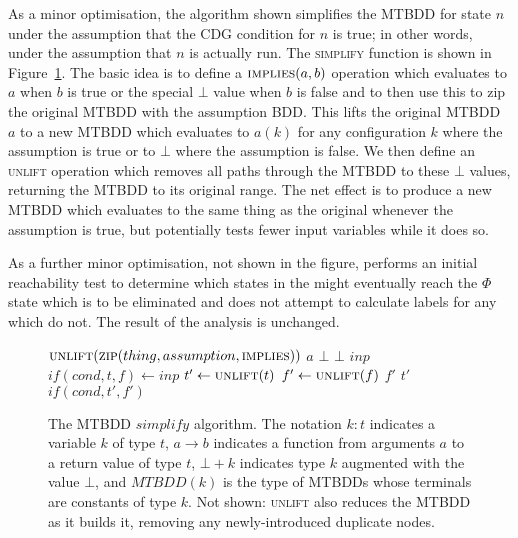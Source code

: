 As a minor optimisation, the algorithm shown simplifies the MTBDD for
state $n$ under the assumption that the CDG condition for $n$ is true;
in other words, under the assumption that $n$ is actually run.  The
\textsc{simplify} function is shown in
Figure~\ref{fig:derive:phi_elimination:simplify}.  The basic idea is
to define a $\textsc{implies}(a, b)$ operation which evaluates to $a$
when $b$ is true or the special $\bot$ value when $b$ is false and to
then use this to zip the original MTBDD with the assumption BDD.  This
lifts the original MTBDD $a$ to a new MTBDD which evaluates to $a(k)$
for any configuration $k$ where the assumption is true or to $\bot$
where the assumption is false.  We then define an \textsc{unlift}
operation which removes all paths through the MTBDD to these $\bot$
values, returning the MTBDD to its original range.  The net effect is
to produce a new MTBDD which evaluates to the same thing as the
original whenever the assumption is true, but potentially tests fewer
input variables while it does so.


As a further minor optimisation, not shown in the figure,
{\implementation} performs an initial reachability test to determine
which states in the {\StateMachine} might eventually reach the $\Phi$
state which is to be eliminated and does not attempt to calculate
labels for any which do not.  The result of the analysis is unchanged.

\begin{figure}
\begin{algorithmic}
  \State \Return $\textsc{unlift}(\textsc{zip}(thing, assumption, \textsc{implies}))$
\EndFunction
{}
    \State \Return $a$
  \Else
    \State \Return $\bot$
  \EndIf
\EndFunction
{}
    \State \Return $\bot$
    \State \Return $inp$
  \Else
    \State $if(cond, t, f) \gets inp$
    \State $t' \gets \textsc{unlift}(t)$
    \State $f' \gets \textsc{unlift}(f)$
      \State \Return $f'$
      \State \Return $t'$
    \Else
      \State \Return $if(cond, t', f')$
    \EndIf
  \EndIf
\EndFunction
\end{algorithmic}
\caption{The MTBDD $simplify$ algorithm.  The notation $k:t$ indicates
  a variable $k$ of type $t$, $a \rightarrow b$ indicates a function
  from arguments $a$ to a return value of type $t$, $\bot + k$
  indicates type $k$ augmented with the value $\bot$, and $MTBDD(k)$
  is the type of MTBDDs whose terminals are constants of type $k$.
  Not shown: \textsc{unlift} also reduces the MTBDD as it builds it,
  removing any newly-introduced duplicate nodes.}
\label{fig:derive:phi_elimination:simplify}
\end{figure}

